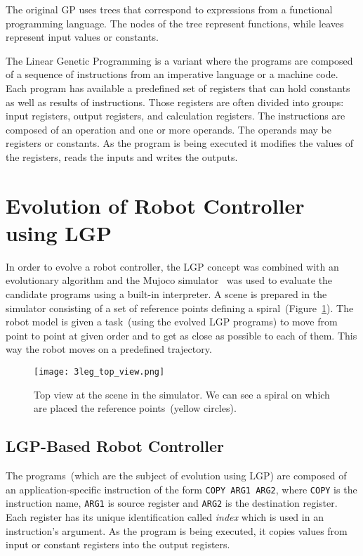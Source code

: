 \documentclass{ExcelAtFIT}
\begin{document}
The original GP uses trees that correspond to expressions from a functional programming language.
The nodes of the tree represent functions, while leaves represent input values or constants.

The Linear Genetic Programming is a variant where the programs are composed of a sequence of instructions from an imperative language or a machine code.
Each program has available a predefined set of registers that can hold constants as well as results of instructions.
Those registers are often divided into groups: input registers, output registers, and calculation registers.
The instructions are composed of an operation and one or more operands.
The operands may be registers or constants.
As the program is being executed it modifies the values of the registers, reads the inputs and writes the outputs.


\section{Evolution of Robot Controller using LGP}
\label{sec:ExperimentsSetup}
In order to evolve a robot controller, the LGP concept was combined with an evolutionary algorithm and the Mujoco simulator~\cite{Todorov2012} was used to evaluate the candidate programs using a built-in interpreter.
A scene is prepared in the simulator consisting of a set of reference points defining a spiral~(Figure~\ref{fig:SpiralTop}).
The robot model is given a task~(using the evolved LGP programs) to move from point to point at given order and to get as close as possible to each of them.
This way the robot moves on a predefined trajectory.

\begin{figure}[h]
\centering
{\texttt{[image: 3leg\_top\_view.png]}}
\caption{Top view at the scene in the simulator.
We can see a spiral on which are placed the reference points~(yellow circles).
}
\label{fig:SpiralTop}
\end{figure}

\subsection{LGP-Based Robot Controller}
\label{subsec:lgp-basedRobotController}
The programs~(which are the subject of evolution using LGP) are composed of an application-specific instruction of the form \texttt{COPY ARG1 ARG2}, where \texttt{COPY} is the instruction name, \texttt{ARG1} is source register and \texttt{ARG2} is the destination register.
Each register has its unique identification called \textit{index} which is used in an instruction's argument.
As the program is being executed, it copies values from input or constant registers into the output registers.
\end{document}
